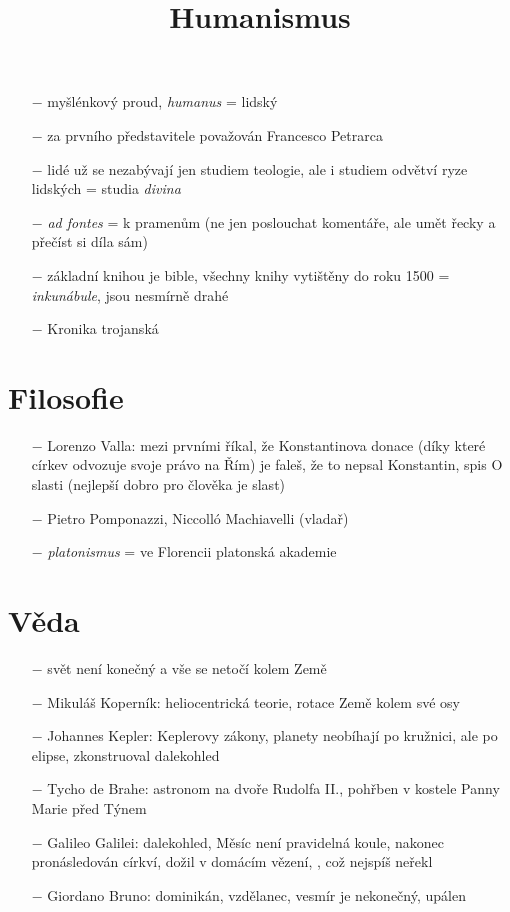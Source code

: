 \documentclass{article}
\title{\vspace{-2cm}Humanismus\vspace{-1.7cm}}
\date{}
\author{}
\begin{document}
\maketitle

\begin{itemize}
    \vspace{-0.5em}
    \setlength\itemsep{0.15em}
    \item[$-$] myšlénkový proud, \textit{humanus} = lidský
    \item[$-$] za prvního představitele považován Francesco Petrarca
    \item[$-$] lidé už se nezabývají jen studiem teologie, ale i studiem odvětví ryze lidských = studia \textit{divina}
    \item[$-$] \textit{ad fontes} = k pramenům (ne jen poslouchat komentáře, ale umět řecky a přečíst si díla sám)
    \item[$-$] základní knihou je bible, všechny knihy vytištěny do roku 1500 = \textit{inkunábule}, jsou nesmírně drahé
    \item[$-$] Kronika trojanská
\end{itemize}

\section*{Filosofie}
\begin{itemize}
    \vspace{-0.5em}
    \setlength\itemsep{0.15em}
    \item[$-$] Lorenzo Valla: mezi prvními říkal, že Konstantinova donace (díky které církev odvozuje svoje právo na Řím) je faleš, že to nepsal Konstantin, spis O slasti (nejlepší dobro pro člověka je slast)
    \item[$-$] Pietro Pomponazzi, Niccolló Machiavelli (vladař)
    \item[$-$] \textit{platonismus} = ve Florencii platonská akademie
\end{itemize}

\section*{Věda}
\begin{itemize}
    \vspace{-0.5em}
    \setlength\itemsep{0.15em}
    \item[$-$] svět není konečný a vše se netočí kolem Země
    \item[$-$] Mikuláš Koperník: heliocentrická teorie, rotace Země kolem své osy
    \item[$-$] Johannes Kepler: Keplerovy zákony, planety neobíhají po kružnici, ale po elipse, zkonstruoval dalekohled
    \item[$-$] Tycho de Brahe: astronom na dvoře Rudolfa II., pohřben v kostele Panny Marie před Týnem
    \item[$-$] Galileo Galilei: dalekohled, Měsíc není pravidelná koule, nakonec pronásledován církví, dožil v domácím vězení, , což nejspíš neřekl
    \item[$-$] Giordano Bruno: dominikán, vzdělanec, vesmír je nekonečný, upálen
\end{itemize}
\end{document}
